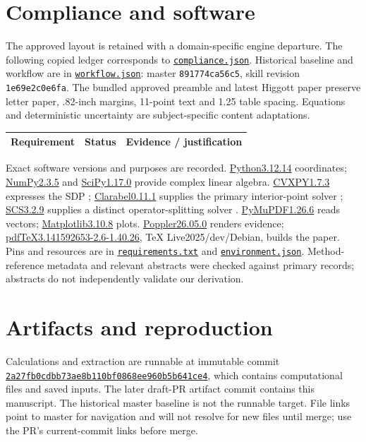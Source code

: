 \documentclass[11pt]{article}
\newcommand{\file}[2]{\href{https://github.com/alectionary/vibe-math/blob/master/formalization/denys-bosonic-pauli/#1}{\nolinkurl{#2}}}
\begin{document}
\section{Compliance and software}
The approved layout is retained with a domain-specific engine departure. The following copied ledger corresponds to \file{provenance/compliance.json}{compliance.json}. Historical baseline and workflow are in \file{provenance/workflow.json}{workflow.json}: master \texttt{891774ca56c5}, skill revision \texttt{1e69e2c0e6fa}. The bundled approved preamble and latest Higgott paper preserve letter paper, .82-inch margins, 11-point text and 1.25 table spacing. Equations and deterministic uncertainty are subject-specific content adaptations.
\small\begin{longtable}{p{.23\linewidth}p{.12\linewidth}p{.57\linewidth}}\toprule Requirement & Status & Evidence / justification\\\midrule\endhead
\end{longtable}\normalsize

Exact software versions and purposes are recorded. \href{https://github.com/python/cpython}{Python3.12.14} coordinates; \href{https://github.com/numpy/numpy}{NumPy2.3.5} and \href{https://github.com/scipy/scipy}{SciPy1.17.0} provide complex linear algebra. \href{https://github.com/cvxpy/cvxpy/tree/v1.7.3}{CVXPY1.7.3} expresses the SDP \citep{diamond}; \href{https://github.com/oxfordcontrol/Clarabel.rs/tree/v0.11.1}{Clarabel0.11.1} supplies the primary interior-point solver \citep{goulart}; \href{https://github.com/cvxgrp/scs}{SCS3.2.9} supplies a distinct operator-splitting solver \citep{odonoghue}. \href{https://github.com/pymupdf/PyMuPDF}{PyMuPDF1.26.6} reads vectors; \href{https://github.com/matplotlib/matplotlib}{Matplotlib3.10.8} plots. \href{https://gitlab.freedesktop.org/poppler/poppler}{Poppler26.05.0} renders evidence; \href{https://github.com/TeX-Live/texlive-source}{pdfTeX3.141592653-2.6-1.40.26}, TeX Live2025/dev/Debian, builds the paper. Pins and resources are in \file{requirements.txt}{requirements.txt} and \file{provenance/environment.json}{environment.json}. Method-reference metadata and relevant abstracts were checked against primary records; abstracts do not independently validate our derivation.

\appendix\section{Artifacts and reproduction}
Calculations and extraction are runnable at immutable commit \href{https://github.com/alectionary/vibe-math/tree/2a27fb0cdbb73ae8b110bf0868ee960b5b641ce4}{\nolinkurl{2a27fb0cdbb73ae8b110bf0868ee960b5b641ce4}}, which contains computational files and saved inputs. The later draft-PR artifact commit contains this manuscript. The historical master baseline is not the runnable target. File links point to master for navigation and will not resolve for new files until merge; use the PR's current-commit links before merge.
\end{document}
